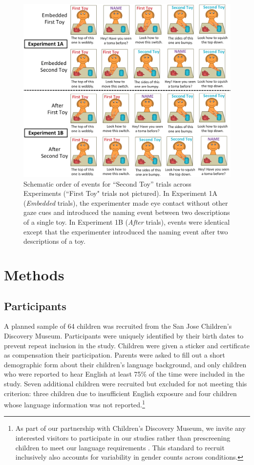 \documentclass[man]{apa2}
\begin{document}
\begin{figure} 
  \begin{center} 
    \includegraphics[width=6in]{figures/continuity_demo_all_trials.png} 
    \caption{\label{fig:demo} Schematic order of events for ``Second Toy'' trials across Experiments (``First Toy" trials not pictured). In Experiment 1A (\emph{Embedded} trials), the experimenter made eye contact without other gaze cues and introduced the naming event between two descriptions of a single toy.  In Experiment 1B (\emph{After} trials), events were identical except that the experimenter introduced the naming event after two descriptions of a toy.} 
  \end{center} 
\end{figure}	

\section{Methods}


\subsection{Participants}

A planned sample of 64 children was recruited from the San Jose Children's Discovery Museum.  Participants were uniquely identified by their birth dates to prevent repeat inclusion in the study.  Children were given a sticker and certificate as compensation their participation.  Parents were asked to fill out a short demographic form about their children's language background, and only children who were reported to hear English at least 75\% of the time were included in the study.  Seven additional children were recruited but excluded for not meeting this criterion: three children due to insufficient English exposure and four children whose language information was not reported.\footnote{As part of our partnership with Children's Discovery Museum, we invite any interested visitors to participate in our studies rather than prescreening children to meet our language requirements \cite{callanan2012}. This standard to recruit inclusively also accounts for variability in gender counts across conditions.}
\end{document}
